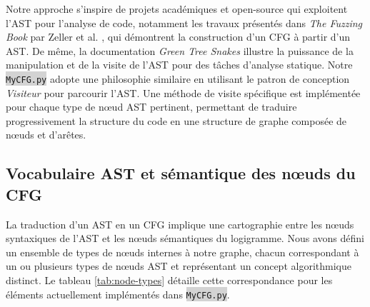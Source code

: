 \documentclass[11pt,a4paper]{article}
\let\cite\parencite
\newcommand{\code}[1]{\colorbox{lightgray}{\texttt{\small #1}}}
\begin{document}
Notre approche s'inspire de projets académiques et open-source qui exploitent l'AST pour l'analyse de code, 
notamment les travaux présentés dans \textit{The Fuzzing Book} par Zeller et al. \cite{fuzzingbook}, qui 
démontrent la construction d'un CFG à partir d'un AST. De même, la documentation \textit{Green Tree Snakes} 
\cite{greentreesnakes} illustre la puissance de la manipulation et de la visite de l'AST pour des tâches 
d'analyse statique. Notre \code{MyCFG.py} adopte une philosophie similaire en utilisant le patron de conception 
\textit{Visiteur} pour parcourir l'AST. Une méthode de visite spécifique est implémentée pour chaque type de 
nœud AST pertinent, permettant de traduire progressivement la structure du code en une structure de graphe 
composée de nœuds et d'arêtes.


 \clearpage
\subsection{Vocabulaire AST et sémantique des nœuds du CFG}

La traduction d'un AST en un CFG implique une cartographie entre les nœuds syntaxiques de l'AST et les nœuds sémantiques du logigramme. Nous avons défini un ensemble de types de nœuds internes à notre graphe, chacun correspondant à un ou plusieurs types de nœuds AST et représentant un concept algorithmique distinct. Le tableau \ref{tab:node-types} détaille cette correspondance pour les éléments actuellement implémentés dans \code{MyCFG.py}.
\end{document}

